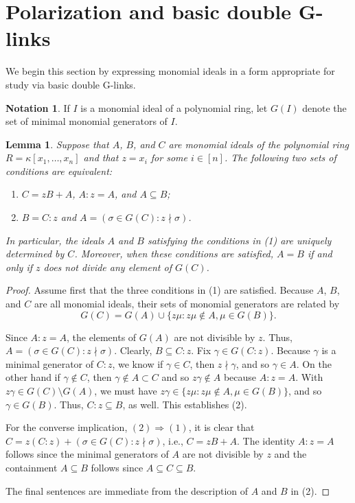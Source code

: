 \documentclass[12pt, reqno]{amsart}
\numberwithin{equation}{section}
\newtheorem{lemma}[theorem]{Lemma}
\newtheorem{Main Conjecture}[theorem]{Main Conjecture}
\theoremstyle{definition}
\newtheorem{notation}[theorem]{Notation}
\theoremstyle{plain}
\begin{document}
\section{Polarization and basic double G-links}\label{s: pol and liaison}
 We begin this section by expressing monomial ideals in a form appropriate for study via basic double G-links. 
 
 \begin{notation}\label{not:minimal-monomial-generators}
     If $I$ is a monomial ideal of a polynomial ring, let $G(I)$ denote the set of minimal monomial generators of $I$.
 \end{notation}
 
\begin{lemma}\label{lem:formOfBDL}
Suppose that $A$, $B$, and $C$ are monomial ideals of the polynomial ring $R = \kappa[x_1, \ldots, x_n]$ and that $z = x_i$ for some $i \in [n]$.  The following two sets of conditions are equivalent:
\begin{enumerate}
    \item $C = zB+A$, $A:z =A$, and $A\subseteq B$;
    \item  $B = C:z$ and $A = (\sigma \in G(C) : z \nmid \sigma)$.
\end{enumerate}
In particular, the ideals $A$ and $B$ satisfying the conditions in (1) are uniquely determined by $C$. Moreover, when these conditions are satisfied, $A=B$ if and only if $z$ does not divide any element of $G(C)$.  
 \end{lemma}
\begin{proof}
Assume first that the three conditions in (1) are satisfied.  Because $A$, $B$, and $C$ are all monomial ideals, their sets of monomial generators are related by 
\[
G(C) = G(A) \cup \{z\mu : z\mu \notin A, \mu \in G(B)\}.
\]

Since  $A:z =A$, the elements of $G(A)$ are not divisible by $z$. Thus, $A = (\sigma \in G(C) : z \nmid \sigma)$.  Clearly, $B \subseteq C:z$.  Fix $\gamma \in G(C:z)$.   Because $\gamma$ is a minimal generator of $C:z$, we know if $\gamma \in C$, then $z \nmid \gamma$,  and so $\gamma \in A$. On the other hand if $\gamma \notin C$, then $\gamma \notin A \subset C$ and so $z\gamma \notin A$ because $A:z = A$.  With $z\gamma \in G(C) \setminus G(A)$, we must have $z\gamma \in \{z\mu : z\mu \notin A, \mu \in G(B)\}$, and so $\gamma \in G(B)$.  Thus, $C:z \subseteq B$, as well. This establishes (2).

For the converse implication, $(2)\Rightarrow (1)$, it is clear that $C = z(C:z)+(\sigma \in G(C) : z \nmid \sigma)$, i.e., $C = zB+A$.
The identity $A:z=A$ follows since the minimal generators of $A$ are not divisible by $z$ and the containment $A\subseteq B$ follows since $A\subseteq C\subseteq B$.

The final sentences are immediate from the description of $A$ and $B$ in (2).
\end{proof}
\end{document}
